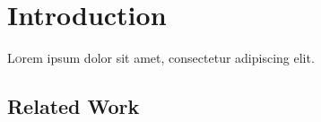 \section{Introduction}

\lettrine[nindent=0em,lines=3]{L} orem ipsum dolor sit amet, consectetur adipiscing elit.



\subsection{Related Work}

